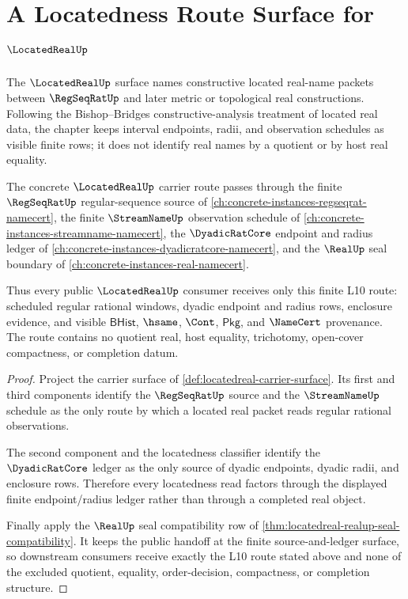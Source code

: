 \chapter{A Locatedness Route Surface for $\LocatedRealUp$}
\label{ch:concrete-instances-locatedreal-namecert-surface}

The $\LocatedRealUp$ surface names constructive located real-name packets between $\RegSeqRatUp$ and later metric or topological real constructions. Following the Bishop--Bridges constructive-analysis treatment of located real data, the chapter keeps interval endpoints, radii, and observation schedules as visible finite rows; it does not identify real names by a quotient or by host real equality.

\begin{theorem}
\label{thm:locatedreal-l10-sibling-dependency-route}
The concrete $\LocatedRealUp$ carrier route passes through the finite $\RegSeqRatUp$ regular-sequence source of \autoref{ch:concrete-instances-regseqrat-namecert}, the finite $\StreamNameUp$ observation schedule of \autoref{ch:concrete-instances-streamname-namecert}, the $\DyadicRatCore$ endpoint and radius ledger of \autoref{ch:concrete-instances-dyadicratcore-namecert}, and the $\RealUp$ seal boundary of \autoref{ch:concrete-instances-real-namecert}.

Thus every public $\LocatedRealUp$ consumer receives only this finite L10 route: scheduled regular rational windows, dyadic endpoint and radius rows, enclosure evidence, and visible $\mathsf{BHist}$, $\hsame$, $\Cont$, $\mathsf{Pkg}$, and $\NameCert$ provenance. The route contains no quotient real, host equality, trichotomy, open-cover compactness, or completion datum.
\end{theorem}
\begin{proof}
Project the carrier surface of \autoref{def:locatedreal-carrier-surface}. Its first and third components identify the $\RegSeqRatUp$ source and the $\StreamNameUp$ schedule as the only route by which a located real packet reads regular rational observations.

The second component and the locatedness classifier identify the $\DyadicRatCore$ ledger as the only source of dyadic endpoints, dyadic radii, and enclosure rows. Therefore every locatedness read factors through the displayed finite endpoint/radius ledger rather than through a completed real object.

Finally apply the $\RealUp$ seal compatibility row of \autoref{thm:locatedreal-realup-seal-compatibility}. It keeps the public handoff at the finite source-and-ledger surface, so downstream consumers receive exactly the L10 route stated above and none of the excluded quotient, equality, order-decision, compactness, or completion structure.
\end{proof}

